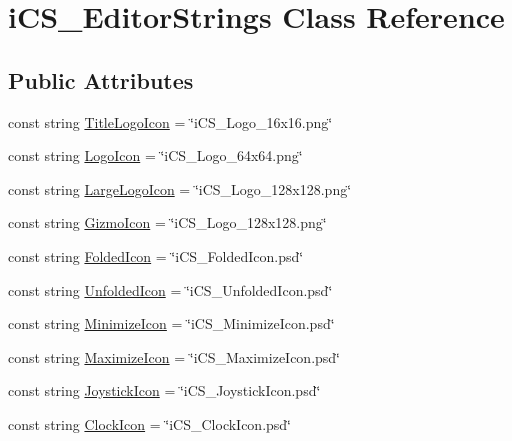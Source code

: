 \hypertarget{classi_c_s___editor_strings}{\section{i\+C\+S\+\_\+\+Editor\+Strings Class Reference}
\label{classi_c_s___editor_strings}
}
\subsection*{Public Attributes}
\begin{DoxyCompactItemize}
\item 
const string \hyperlink{classi_c_s___editor_strings_a93c0ec111759a09816d0808d77a91c8d}{Title\+Logo\+Icon} = \char`\"{}i\+C\+S\+\_\+\+Logo\+\_\+16x16.\+png\char`\"{}
\item 
const string \hyperlink{classi_c_s___editor_strings_a312e86d06c8c9f82d9179fd1f259dae6}{Logo\+Icon} = \char`\"{}i\+C\+S\+\_\+\+Logo\+\_\+64x64.\+png\char`\"{}
\item 
const string \hyperlink{classi_c_s___editor_strings_add05885cd2ab8850fbd3587312154234}{Large\+Logo\+Icon} = \char`\"{}i\+C\+S\+\_\+\+Logo\+\_\+128x128.\+png\char`\"{}
\item 
const string \hyperlink{classi_c_s___editor_strings_adf3eb073880a892c07e747c76bae44f0}{Gizmo\+Icon} = \char`\"{}i\+C\+S\+\_\+\+Logo\+\_\+128x128.\+png\char`\"{}
\item 
const string \hyperlink{classi_c_s___editor_strings_a9b51142c4a7744da8796445b9797575c}{Folded\+Icon} = \char`\"{}i\+C\+S\+\_\+\+Folded\+Icon.\+psd\char`\"{}
\item 
const string \hyperlink{classi_c_s___editor_strings_addfb1e5968a7e181849926752908bb22}{Unfolded\+Icon} = \char`\"{}i\+C\+S\+\_\+\+Unfolded\+Icon.\+psd\char`\"{}
\item 
const string \hyperlink{classi_c_s___editor_strings_ae32437183a97f9c666efb153ec6b3f74}{Minimize\+Icon} = \char`\"{}i\+C\+S\+\_\+\+Minimize\+Icon.\+psd\char`\"{}
\item 
const string \hyperlink{classi_c_s___editor_strings_ac1da5468ac7613e14174ce420dfa7527}{Maximize\+Icon} = \char`\"{}i\+C\+S\+\_\+\+Maximize\+Icon.\+psd\char`\"{}
\item 
const string \hyperlink{classi_c_s___editor_strings_a5f00276adc1da19e974696f84ea6e335}{Joystick\+Icon} = \char`\"{}i\+C\+S\+\_\+\+Joystick\+Icon.\+psd\char`\"{}
\item 
const string \hyperlink{classi_c_s___editor_strings_a41db2804cc955b9d5ce03bd318ed2e6c}{Clock\+Icon} = \char`\"{}i\+C\+S\+\_\+\+Clock\+Icon.\+psd\char`\"{}

\end{DoxyCompactItemize}
